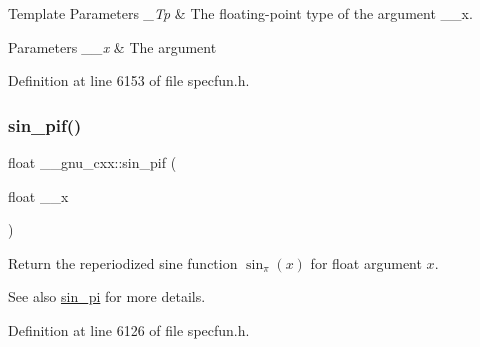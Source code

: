 \begin{DoxyTemplParams}{Template Parameters}
{\em \+\_\+\+Tp} & The floating-\/point type of the argument {\ttfamily \+\_\+\+\_\+x}. \\
\hline
\end{DoxyTemplParams}

\begin{DoxyParams}{Parameters}
{\em \+\_\+\+\_\+x} & The argument \\
\hline
\end{DoxyParams}


Definition at line 6153 of file specfun.\+h.

\mbox{\label{group__gnu__math__spec__func_ga74fc8e2dd770850e7ea8bf8a28a71777}} 
\subsubsection{\texorpdfstring{sin\+\_\+pif()}{sin\_pif()}}
{\footnotesize\ttfamily float \+\_\+\+\_\+gnu\+\_\+cxx\+::sin\+\_\+pif (\begin{DoxyParamCaption}\item[{float}]{\+\_\+\+\_\+x }\end{DoxyParamCaption})\hspace{0.3cm}{\ttfamily [inline]}}

Return the reperiodized sine function $ \sin_\pi(x) $ for {\ttfamily float} argument $ x $.

\begin{DoxySeeAlso}{See also}
\hyperlink{group__gnu__math__spec__func_ga220f8a9a0477697cff96e84dc911d5f0}{sin\+\_\+pi} for more details. 
\end{DoxySeeAlso}


Definition at line 6126 of file specfun.\+h.

\mbox{\label{group__gnu__math__spec__func_ga0bda860961b0a121e266b278f260634b}} 
